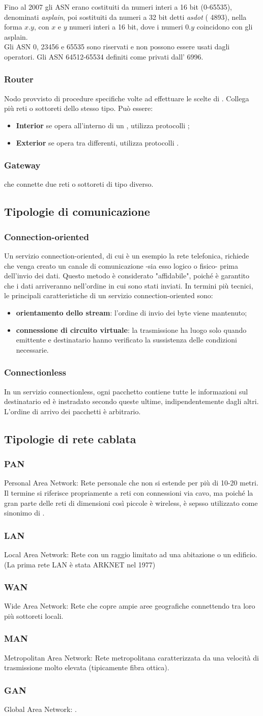 \documentclass[a4paper,11pt]{article}
\def\sub#1{\subsection{#1}\label{#1}}
\def\subsub#1{\subsubsection{#1}\label{#1}}
\def\vedi#1{\nameref{#1}}
\def\italic#1{\textit{#1}}
\begin{document}
Fino al 2007 gli ASN erano costituiti da numeri interi
a 16 bit (0-65535), denominati \textit{asplain}, poi sostituiti da numeri a 32 bit detti \italic{asdot} (\vedi{RFC} 4893),
nella forma $x.y$, con $x$ e $y$ numeri interi a 16 bit, dove i numeri $0.y$ coincidono con gli asplain.\\ %
Gli ASN 0, 23456 e 65535 sono riservati e non possono
essere usati dagli operatori.
Gli ASN 64512-65534 definiti come privati dall'\vedi{RFC} 
6996. %
\subsub{Router}
Nodo provvisto di procedure specifiche volte ad effettuare le scelte di \vedi{Routing}. Collega più reti o sottoreti dello stesso tipo. Può essere:
\begin{itemize}
\item \textbf{Interior} se opera all'interno di un \vedi{AS}, utilizza protocolli \vedi{IGP};
\item \textbf{Exterior} se opera tra \vedi{AS} differenti, utilizza protocolli \vedi{EGP}.
\end{itemize}
\subsub{Gateway} 
\vedi{Router} che connette due reti o sottoreti di tipo diverso.
\sub{Tipologie di comunicazione}
\subsub{Connection-oriented} 
Un servizio connection-oriented, di cui è un esempio la rete telefonica, richiede che venga creato un canale di comunicazione -sia esso logico o fisico- prima dell'invio dei dati. Questo metodo è considerato "affidabile", poiché è garantito che i dati arriveranno nell'ordine in cui sono stati inviati. In termini più tecnici, le principali caratteristiche di un servizio connection-oriented sono:
\begin{itemize}
\item \textbf{orientamento dello stream}: l'ordine di invio dei byte viene mantenuto;
\item \textbf{connessione di circuito virtuale}: la trasmissione ha luogo solo quando emittente e destinatario hanno verificato la sussistenza delle condizioni necessarie.
\end{itemize}
\subsub{Connectionless}
In un servizio connectionless, ogni pacchetto contiene tutte le informazioni sul destinatario ed è instradato secondo queste ultime, indipendentemente dagli altri. L'ordine di arrivo dei pacchetti è arbitrario.

\newpage
\sub{Tipologie di rete cablata}
\subsub{PAN} Personal Area Network: Rete personale che non si estende per più di 10-20 metri. Il termine si riferisce propriamente a reti con connessioni via cavo, ma poiché la gran parte delle reti di dimensioni così piccole è wireless, è sepsso utilizzato come sinonimo di \vedi{WPAN}. 
\subsub{LAN} Local Area Network: Rete con un raggio limitato ad una abitazione o un edificio. (La prima rete LAN è stata ARKNET nel 1977)
\subsub{WAN} Wide Area Network: Rete che copre ampie aree geografiche connettendo tra loro più sottoreti locali. 
\subsub{MAN} Metropolitan Area Network: Rete metropolitana caratterizzata da una velocità di trasmissione molto elevata (tipicamente fibra ottica).
\subsub{GAN} Global Area Network: \vedi{Internet}.
\end{document}
